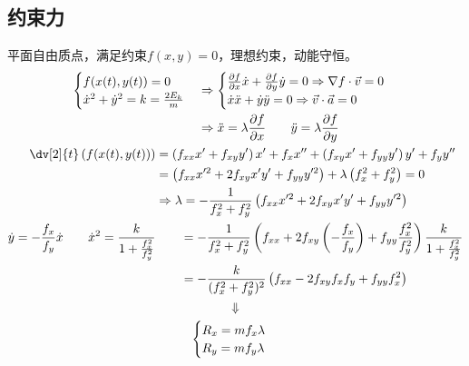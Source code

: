 \documentclass[12pt, a4paper, oneside, UTF8]{ctexbook}  %
\newcommand{\pa}{\partial}
\begin{document}
\subsection{约束力}
\begin{example}
    平面自由质点，满足约束\(f(x,y)=0\)，理想约束，动能守恒。
    \begin{gather*}
\begin{aligned}
    \begin{cases}
        f(x(t),y(t))=0\\
        \dot{x}^2+\dot{y}^2=k=\frac{2E_k}{m}
    \end{cases}&\Rightarrow
\begin{cases}
\frac{\pa f}{\pa x}\dot{x}+\frac{\pa f}{\pa y}\dot{y}=0
\Rightarrow\nabla f\cdot\vec{v}=0\\
\dot{x}\ddot{x}+\dot{y}\ddot{y}=0
\Rightarrow\vec{v}\cdot\vec{a}=0
\end{cases}\\&
\Rightarrow
\ddot{x}=\lambda\frac{\pa f}{\pa x}\qquad 
\ddot{y}=\lambda\frac{\pa f}{\pa y}\\
\end{aligned}\\
\begin{aligned}
    \dv[2]{t}\left(f(x(t),y(t))\right)
&=\left(f_{xx}x'+f_{xy}y'\right)x'+f_x x''
+\left(f_{xy}x'+f_{yy}y'\right)y'+f_y y''
\\&=\left(f_{xx}x'^2+2f_{xy}x'y'+f_{yy}y'^2\right)
+\lambda\left(f_x^2+f_y^2\right)=0
\\&\Rightarrow\lambda=-\frac{1}{f_x^2+f_y^2}
\left(f_{xx}x'^2+2f_{xy}x'y'+f_{yy}y'^2\right)\\
\dot{y}=-\frac{f_x}{f_y}\dot{x}
\qquad\dot{x}^2=\frac{k}{1+\frac{f_x^2}{f_y^2}}
&\qquad=-\frac{1}{f_x^2+f_y^2}\left(f_{xx}+2f_{xy}\left(-\frac{f_x}{f_y}\right)
+f_{yy}\frac{f_x^2}{f_y^2}\right)\frac{k}{1+\frac{f_x^2}{f_y^2}}\\
&\qquad=-\frac{k}{(f_x^2+f_y^2)^2}
\left(f_{xx}-2f_{xy}f_xf_y+f_{yy}f_x^2\right)
\end{aligned}\\
\Downarrow\\
\begin{cases}
    R_x=mf_x \lambda\\
    R_y=mf_y \lambda
\end{cases}
    \end{gather*}
\end{example}
\end{document}

